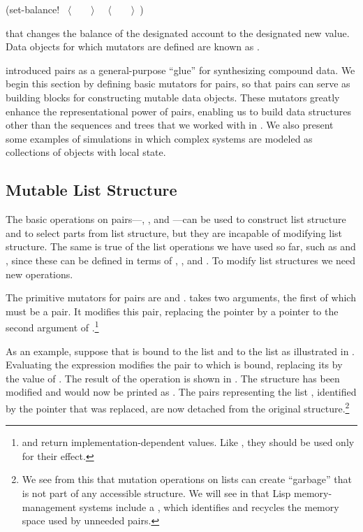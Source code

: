 \begin{codeBlock}
(set-balance! ~\(\langle \)~~~~\(\rangle \)~ ~\(\langle \)~~~~\(\rangle \)~)
\end{codeBlock}

\noindent
that changes the balance of the designated account to the designated new value.
Data objects for which mutators are defined are known as .

 introduced pairs as a general-purpose ``glue'' for synthesizing
compound data.  We begin this section by defining basic mutators for pairs, so
that pairs can serve as building blocks for constructing mutable data objects.
These mutators greatly enhance the representational power of pairs, enabling us
to build data structures other than the sequences and trees that we worked with
in .  We also present some examples of simulations in which
complex systems are modeled as collections of objects with local state.



\subsection{Mutable List Structure}
\label{Section 3.3.1}

The basic operations on pairs---, , and ---can
be used to construct list structure and to select parts from list structure,
but they are incapable of modifying list structure.  The same is true of the
list operations we have used so far, such as  and ,
since these can be defined in terms of , , and .
To modify list structures we need new operations.

The primitive mutators for pairs are  and
.  takes two arguments, the first of which must
be a pair.  It modifies this pair, replacing the  pointer by a
pointer to the second argument of .\footnote{ and
 return implementation-dependent values.  Like , they
should be used only for their effect.}

As an example, suppose that  is bound to the list 
and  to the list  as illustrated in .
Evaluating the expression  modifies the pair to which
 is bound, replacing its  by the value of .  The
result of the operation is shown in .  The structure 
has been modified and would now be printed as .  The pairs
representing the list , identified by the pointer that was
replaced, are now detached from the original structure.\footnote{We see from
this that mutation operations on lists can create ``garbage'' that is not part
of any accessible structure.  We will see in  that Lisp
memory-management systems include a , which
identifies and recycles the memory space used by unneeded pairs.}

